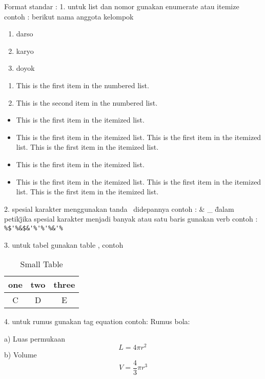 Format standar :
1. untuk list dan nomor gunakan enumerate atau itemize
	contoh :
	berikut nama anggota kelompok
	\begin{enumerate}
	\item darso
	\item karyo
	\item doyok
	\end{enumerate}
	
	\begin{enumerate}
	\item
	This is the first item in the numbered list.

	\item
	This is the second item in the numbered list.
	\end{enumerate}

	\begin{itemize}
	\item
	This is the first item in the itemized list.

	\item
	This is the first item in the itemized list.
	This is the first item in the itemized list.
	This is the first item in the itemized list.
	\end{itemize}

	\begin{itemize}
	\item[]
	This is the first item in the itemized list.

	\item[]
	This is the first item in the itemized list.
	This is the first item in the itemized list.
	This is the first item in the itemized list.
	\end{itemize}

2. spesial karakter menggunakan tanda \ didepannya
	contoh :
	\&
	\_
	\"dalam petik\"
	jika spesial karakter menjadi banyak atau satu baris gunakan verb
	contoh :
	\verb|%$'%&$&'%'%'%&'%|
	
3. untuk tabel gunakan table , contoh

\begin{table}[h]
\caption{Small Table}
\centering
\begin{tabular}{ccc}
\hline
one&two&three\\
\hline
C&D&E\\
\hline
\end{tabular}
\end{table}

4. untuk rumus gunakan tag equation
	contoh:
	Rumus bola:

	a) Luas permukaan
	 \begin{equation}
	     L = 4 \pi r^2 \,
	\end{equation}
	b) Volume
	 \begin{equation}
	     V = \frac{4}{3}\pi r^3
	\end{equation}
	
